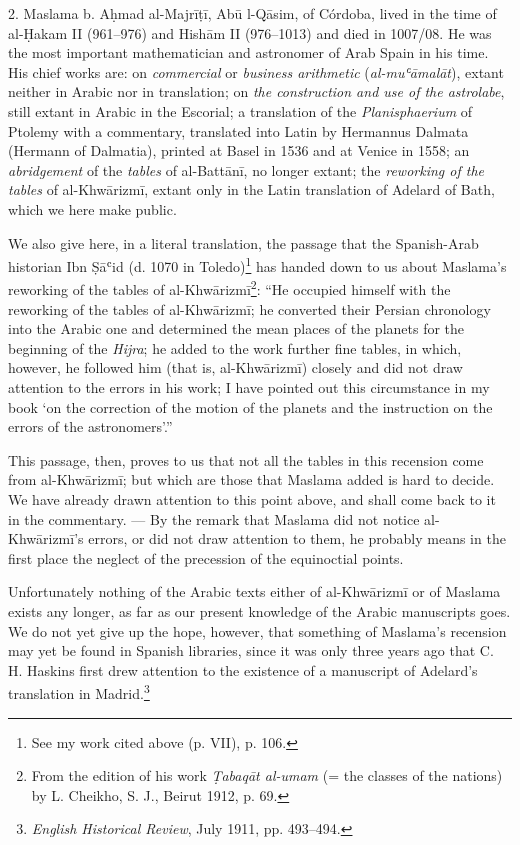 \documentclass[11pt]{article}
\newcommand{\Pg}[1]{\marginpar{\footnotesize\color{gray}#1}}
\begin{document}
\par 2. Maslama b. Aḥmad al-Majrīṭī, Abū l-Qāsim, of Córdoba, lived in the time of al-Ḥakam II (961–976) and Hishām II (976–1013) and died in 1007/08. He was the most important mathematician and astronomer of Arab Spain in his time. His chief works are: on \emph{commercial} or \emph{business arithmetic} (\emph{al-muʿāmalāt}), extant neither in Arabic nor in translation; on \emph{the construction and use of the astrolabe}, still extant in Arabic in the Escorial; a translation of the \emph{Planisphaerium} of Ptolemy with a commentary, translated into Latin by Hermannus Dalmata (Hermann of Dalmatia), printed at Basel in 1536 and at Venice in 1558; an \emph{abridgement} of the \emph{tables} of al-Battānī, no longer extant; the \emph{reworking of the tables} of al-Khwārizmī, extant only in the Latin translation of Adelard of Bath, which we here make public.\par
\par We also give here, in a literal translation, the passage that the Spanish-Arab historian Ibn Ṣāʿid (d. 1070 in Toledo)\footnote{See my work cited above (p. VII), p. 106.} has handed down to us about Maslama's reworking of the tables of al-Khwārizmī\footnote{From the edition of his work \emph{Ṭabaqāt al-umam} (= the classes of the nations) by L. Cheikho, S. J., Beirut 1912, p. 69.}: “He occupied himself with the reworking of the tables of al-Khwārizmī; he converted their Persian chronology into the Arabic one and determined the mean places of the planets for the beginning of the \emph{Hijra}; he added to the work further fine tables, in which, however, he followed him (that is, al-Khwārizmī) closely and did not draw attention to the errors in his work; I have pointed out this circumstance in my book ‘on the correction of the motion of the planets and the instruction on the errors of the astronomers’.”\par
\par This passage, then, proves to us that not all the tables in this recension come from al-Khwārizmī; but which are those that Maslama added is hard to decide. We have already drawn attention to this point above, and shall come back to it in the commentary. — By the remark that Maslama did not notice al-Khwārizmī's errors, or did not draw attention to them, he probably means in the first place the neglect of the precession of the equinoctial points.\par
\par \Pg{X}Unfortunately nothing of the Arabic texts either of al-Khwārizmī or of Maslama exists any longer, as far as our present knowledge of the Arabic manuscripts goes. We do not yet give up the hope, however, that something of Maslama's recension may yet be found in Spanish libraries, since it was only three years ago that C. H. Haskins first drew attention to the existence of a manuscript of Adelard's translation in Madrid.\footnote{\emph{English Historical Review}, July 1911, pp. 493–494.}\par
\end{document}
